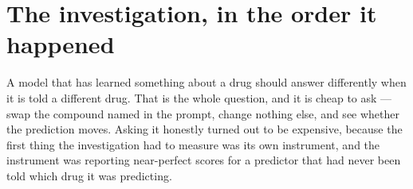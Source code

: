 
\section[The investigation]{The investigation, in the order it happened}
\label{sec:methods}
\label{sec:results}

\newenvironment{claim}{%
 \par\addvspace{1.4\baselineskip}%
 \begin{list}{}{\setlength{\leftmargin}{1.5em}\setlength{\rightmargin}{1.5em}%
 \setlength{\topsep}{0pt}\setlength{\parsep}{0pt}}%
 \item\relax\noindent{\scshape The claim.}\enspace\ignorespaces
}{%
 \end{list}%
 \par\addvspace{1.4\baselineskip}%
}

A model that has learned something about a drug should answer differently when it is told a
different drug. That is the whole question, and it is cheap to ask --- swap the compound named in
the prompt, change nothing else, and see whether the prediction moves. Asking it honestly turned out
to be expensive, because the first thing the investigation had to measure was its own instrument,
and the instrument was reporting near-perfect scores for a predictor that had never been told which
drug it was predicting.

